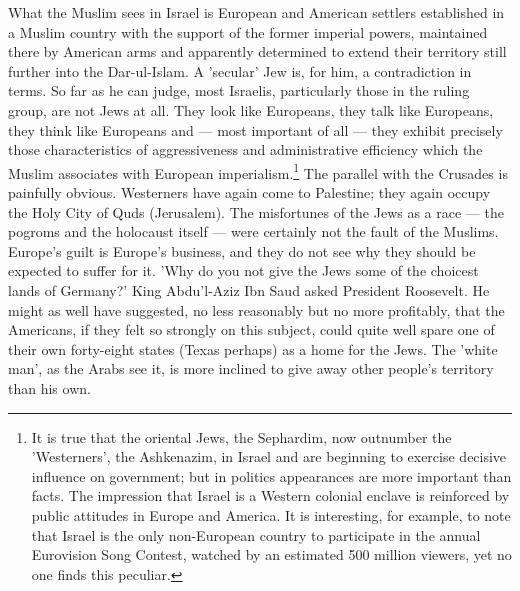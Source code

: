 \documentclass[10pt, twoside,openright]{book}
\begin{document}
What the Muslim sees in Israel is European and American settlers established in a Muslim country with the support of the former imperial powers, maintained there by American arms and apparently determined to extend their territory still further into the Dar\hyp{}ul\hyp{}Islam. A 'secular' Jew is, for him, a contradiction in terms. So far as he can judge, most Israelis, particularly those in the ruling group, are not Jews at all. They look like Europeans, they talk like Europeans, they think like Europeans and --- most important of all --- they exhibit precisely those characteristics of aggressiveness and administrative efficiency which the Muslim associates with European imperialism.\footnote{It is true that the oriental Jews, the Sephardim, now outnumber the 'Westerners', the Ashkenazim, in Israel and are beginning to exercise decisive influence on government; but in politics appearances are more important than facts. The impression that Israel is a Western colonial enclave is reinforced by public attitudes in Europe and America. It is interesting, for example, to note that Israel is the only non\hyp{}European country to participate in the annual Eurovision Song Contest, watched by an estimated 500 million viewers, yet no one finds this peculiar.} The parallel with the Crusades is painfully obvious. Westerners have again come to Palestine; they again occupy the Holy City of Quds (Jerusalem). The misfortunes of the Jews as a race --- the pogroms and the holocaust itself --- were certainly not the fault of the Muslims. Europe's guilt is Europe's business, and they do not see why they should be expected to suffer for it. 'Why do you not give the Jews some of the choicest lands of Germany?' King Abdu'l\hyp{}Aziz Ibn Saud asked President Roosevelt. He might as well have suggested, no less reasonably but no more profitably, that the Americans, if they felt so strongly on this subject, could quite well spare one of their own forty\hyp{}eight states (Texas perhaps) as a home for the Jews. The 'white man', as the Arabs see it, is more inclined to give away other people's territory than his own. \\
\end{document}
